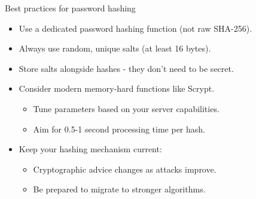 \documentclass[aspectratio=169, lualatex, handout]{beamer}
\begin{document}
\begin{frame}{Best practices for password hashing}
	\begin{itemize}
		\item Use a dedicated password hashing function (not raw SHA-256).
		\item Always use random, unique salts (at least 16 bytes).
		\item Store salts alongside hashes - they don't need to be secret.
		\item Consider modern memory-hard functions like Scrypt.
		      \begin{itemize}
			      \item Tune parameters based on your server capabilities.
			      \item Aim for 0.5-1 second processing time per hash.
		      \end{itemize}
		\item Keep your hashing mechanism current:
		      \begin{itemize}
			      \item Cryptographic advice changes as attacks improve.
			      \item Be prepared to migrate to stronger algorithms.
		      \end{itemize}
	\end{itemize}
\end{frame}
\end{document}
